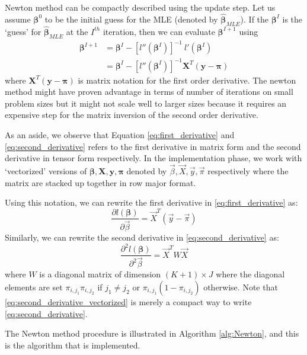 \documentclass[12pt]{article}
\newcommand{\bS}[1] {\boldsymbol  #1}
\newcommand{\MLE}{\hat{\bS{\beta}}_{MLE}}
\begin{document}
Newton method can be compactly described using the update step. Let us assume $\bS{\beta^0}$ to be the initial guess for the MLE (denoted by $\MLE$). If the $\bS{\beta^I}$ is the `guess' for $\MLE$ at the $I^{th}$ iteration, then we can evaluate $\bS{\beta^{I+1}}$ using
\begin{align}\label{eq:update}
\bS{\beta^{I+1}} &= \bS{\beta^{I}} - [l''(\bS{\beta^{I}})]^{-1}  \ l'(\bS{\beta^{I}}) \\
&= \bS{\beta^{I}} - [l''(\bS{\beta^{I}})]^{-1}  \bS{X}^{T} (\bS{y} - \bS{\pi}) 
\end{align}
where $\bS{X}^{T} (\bS{y} - \bS{\pi})$ is matrix notation for the first order derivative.
The newton method might have proven advantage in terms of number of iterations on small problem sizes but it might not scale well to larger sizes because it requires an expensive step for the matrix inversion of the second order derivative. 

As an aside, we observe that Equation \eqref{eq:first_derivative} and \eqref{eq:second_derivative} refers to the first derivative in matrix form and the second derivative in tensor form respectively. In the implementation phase, we work with `vectorized' versions of $\bS{\beta},\bS{X},\bS{y}, \bS{\pi}$ denoted by $\vec{\beta},\vec{X},\vec{y}, \vec{\pi}$ respectively where the matrix are stacked up together in row major format.  

Using this notation, we can rewrite the first derivative in \eqref{eq:first_derivative} as:
\begin{equation}\label{eq:first_derivative_vectorized}
\frac{\partial l(\bS{\beta})}{\partial \vec{\beta}} = \vec{X}^{T} (\vec{y} - \vec{\pi}) 
\end{equation}
Similarly, we can rewrite the second derivative in  \eqref{eq:second_derivative} as:
\begin{equation}\label{eq:second_derivative_vectorized}
\frac{\partial^2 l(\bS{\beta})}{\partial^2 \vec{\beta}} = \vec{X}^{T} W \vec{X}
\end{equation}
where $W$ is a diagonal matrix of dimension $(K+1) \times J $ where the diagonal elements are set $\pi_{i,j_1}\pi_{i,j_2}$ if $j_1 \neq j_2$ or $\pi_{i,j_1}(1-\pi_{i,j_2})$ otherwise. Note that \eqref{eq:second_derivative_vectorized} is merely a compact way to write \eqref{eq:second_derivative}. 

The Newton method procedure is illustrated in Algorithm \ref{alg:Newton}, and this is the algorithm that is implemented.  
\end{document}
